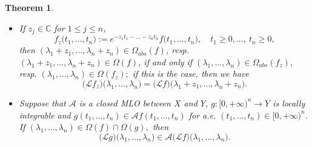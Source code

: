 \documentclass{amsart}
\newtheorem{thm}{Theorem}[section]
\theoremstyle{definition}
\theoremstyle{remark}
\numberwithin{equation}{section}
\begin{document}
\begin{thm}
\begin{itemize}
$$T\bigl({\mathcal Lf}\bigr) \bigl(\lambda_{1},...,\lambda_{n}\bigr)=\bigl({\mathcal L(Tf)}\bigr)\bigl(\lambda_{1},...,\lambda_{n}\bigr).
$$
\item[(iv)] If $z_{j}\in {\mathbb C}$ for $1\leq j\leq n$, 
$$
f_{z}\bigl(t_{1},...,t_{n}\bigr):=e^{-z_{1}t_{1}-...-z_{n}t_{n}}f\bigl(t_{1},...,t_{n}\bigr),\quad t_{1}\geq 0, ..., \ t_{n}\geq 0,
$$ 
then $(\lambda_{1}+z_{1},...,\lambda_{n}+z_{n})\in \Omega_{abs}(f)$, resp. $(\lambda_{1}+z_{1},...,\lambda_{n}+z_{n})\in \Omega(f)$, if and only if $(\lambda_{1},...,\lambda_{n})\in \Omega_{abs}(f_{z}),$ resp. $(\lambda_{1},...,\lambda_{n})\in \Omega(f_{z});$ if this is the case, then we have 
$$
\bigl({\mathcal Lf_{z}}\bigr) \bigl(\lambda_{1},...,\lambda_{n}\bigr)=\bigl({\mathcal Lf}\bigr)\bigl(\lambda_{1}+z_{1},...,\lambda_{n}+z_{n}\bigr).
$$
\item[(v)] Suppose that ${\mathcal A}$ is a closed \emph{MLO} between $X$ and $Y$, $g: [0,+\infty)^{n}\rightarrow Y$ is locally integrable and $g(t_{1},...,t_{n})\in {\mathcal A}f(t_{1},...,t_{n})$ for a.e. $(t_{1},...,t_{n})\in [0,+\infty)^{n}.$ If $(\lambda_{1},...,\lambda_{n})\in \Omega(f) \cap \Omega(g),$ then 
$$
\bigl({\mathcal Lg}\bigr)\bigl(\lambda_{1},...,\lambda_{n}\bigr)\in {\mathcal A}\bigl({\mathcal Lf}\bigr) \bigl(\lambda_{1},...,\lambda_{n}\bigr).
$$
\end{itemize}
\end{thm}
\end{document}
